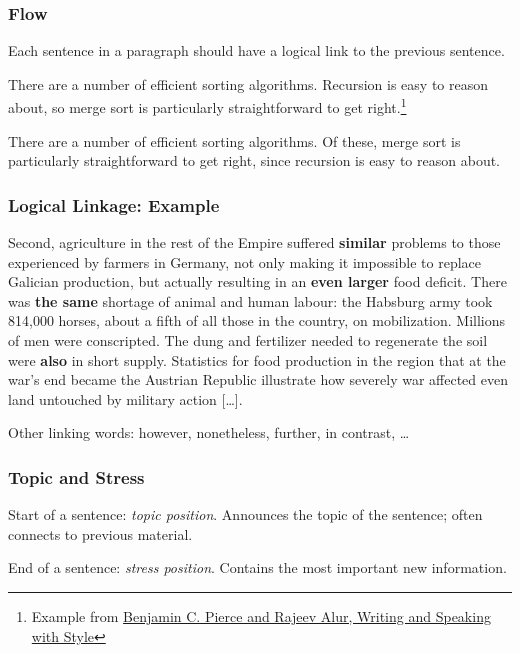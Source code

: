 \begin{frame}
  \frametitle{Flow}

  Each sentence in a paragraph should have a logical link to the previous sentence.

  \medskip
  \pause


  {
    \small
    There are a number of efficient sorting algorithms.
    Recursion is easy to reason about, so merge sort is particularly straightforward to get right.\footnote{Example from \href{https://docs.google.com/document/d/1_vBXbugoLjO171w3wovs3ugmRQI-O6EcSVFDBF7eUzE/edit}{Benjamin C. Pierce and Rajeev Alur, Writing and Speaking with Style}}
  }

  \medskip
  \pause


  {
    \small
    There are a number of efficient sorting algorithms.
    Of these, merge sort is particularly straightforward to get right, since recursion is easy to reason about.
  }
\end{frame}

\begin{frame}
  \frametitle{Logical Linkage: Example}

  {
  \small
  Second, agriculture in the rest of the Empire suffered \textbf{similar} problems to those experienced by farmers in Germany, not only making it impossible to replace Galician production, but actually resulting in an \textbf{even larger} food deficit.
  There was \textbf{the same} shortage of animal and human labour: the Habsburg army took 814,000 horses, about a fifth of all those in the country, on mobilization.
  Millions of men were conscripted.
  The dung and fertilizer needed to regenerate the soil were \textbf{also} in short supply.
  Statistics for food production in the region that at the war's end became the Austrian Republic illustrate how severely war affected even land untouched by military action [\dots].
  }

  \medskip

  Other linking words: however, nonetheless, further, in contrast, \dots
\end{frame}

\begin{frame}
  \frametitle{Topic and Stress}

  Start of a sentence: \emph{topic position}.
  Announces the topic of the sentence; often connects to previous material.

  \medskip

  End of a sentence: \emph{stress position}.
  Contains the most important new information.
\end{frame}

